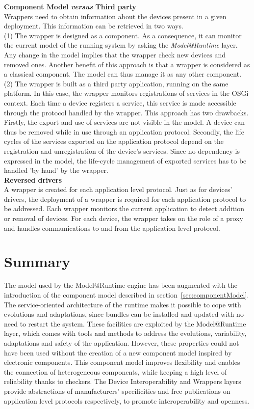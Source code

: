 {\bf Component Model {\it versus} Third party}\\
Wrappers need to obtain information about the devices present in a given deployment. This information can be retrieved in two ways.\\
(1) The wrapper is designed as a component. As a consequence, it can monitor the current model of the running system by asking the {\it Model@Runtime} layer. Any change in the model implies that the wrapper check new devices and removed ones. Another benefit of this approach is that a wrapper is considered as a classical component. The model can thus manage it as any other component.\\
(2) The wrapper is built as a third party application, running on the same platform. In this case, the wrapper monitors registrations of services in the OSGi context. Each time a device registers a service, this service is made accessible through the protocol handled by the wrapper. This approach has two drawbacks. Firstly, the export and use of services are not visible in the model. A device can thus be removed while in use through an application protocol. Secondly, the life cycles of the services exported on the application protocol depend on the registration and unregistration of the device's services. Since no dependency is expressed in the model, the life-cycle management of exported services has to be handled 'by hand' by the wrapper.\\

{\bf Reversed drivers}\\
A wrapper is created for each application level protocol. Just as for devices' drivers, the deployment of a wrapper is required for each application protocol to be addressed. Each wrapper monitors the current application to detect addition or removal of devices. For each device, the wrapper takes on the role of a proxy and handles communications to and from the application level protocol.


\section{Summary}
The model used by the Model@Runtime engine has been augmented with the introduction of the component model described in section~\ref{sec:componentModel}.\\
The service-oriented architecture of the runtime makes it possible to cope with evolutions and adaptations, since bundles can be installed and updated with no need to restart the system. These facilities are exploited by the Model@Runtime layer, which comes with tools and methods to address the evolutions, variability, adaptations and safety of the application. However, these properties could not have been used without the creation of a new component model inspired by electronic components. This component model improves flexibility and enables the connection of heterogeneous components, while keeping a high level of reliability thanks to checkers. The Device Interoperability and Wrappers layers provide abstractions of manufacturers' specificities and free publications on application level protocols respectively, to promote interoperability and openness.



